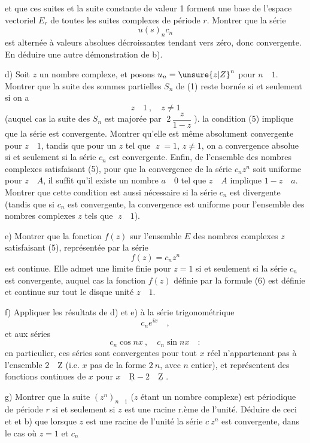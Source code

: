 et que ces suites et la suite constante de valeur 1 forment une base de l'espace vectoriel $E_r$ de toutes les suites complexes de période $r$. Montrer que la série
\[
u(s)_n c_n
\]
est alternée à valeurs absolues décroissantes tendant vers zéro, donc convergente. En déduire une autre démonstration de b).

d) Soit $z$ un nombre complexe, et posons $u_n=\unsure{z|Z}^{n}$ pour $n\quad 1$. Montrer que la suite des sommes partielles $S_n$ de (1) reste bornée si et seulement si on a
\[
z\quad1\ ,\quad z\ne1\tag*{(5)}
\]
(auquel cas la suite des $S_n$ est majorée par $\;2\,\dfrac{z}{1-z}\;$).   la condition (5) implique que la série   est convergente. Montrer qu'elle est même absolument convergente pour $z\quad1$, tandis que pour un $z$ tel que $\;z\;=1$, $z\ne1$, on a convergence absolue si et seulement si la  série $c_n$ est convergente. Enfin,   de l'ensemble  des nombres complexes satisfaisant (5), pour que la convergence de la série $c_n z^n$ soit uniforme pour $z\quad A$, il suffit qu'il existe un nombre $a\quad0$ tel que $z\quad A$ implique $1-z\quad a$. Montrer que cette condition est aussi nécessaire si la série $c_n$ est divergente (tandis que si $c_n$ est convergente, la convergence est uniforme pour l'ensemble des nombres complexes $z$ tels que $\;z\quad1$). 

e) Montrer que la fonction $f(z)$ sur l'ensemble $E$ des nombres complexes $z$ satisfaisant (5), représentée par la série
\[
f(z)=c_n z^n\tag*{(6)}
\]
est continue. Elle admet une limite finie pour $z=1$ si et seulement si la  série $c_n$ est convergente, auquel cas la fonction $f(z)$ définie par la formule (6) est définie et continue  sur tout le disque unité $z\quad1$.

f) Appliquer les résultats de d) et e) à la série trigonométrique
\[
c_n e^{ix}\quad ,
\]
et aux séries
\[
c_n\cos nx\ ,\quad c_n\sin nx\quad :
\]
en particulier, ces séries sont convergentes pour tout $x$ réel n'appartenant pas à l'ensemble  $2\quad\underline{\mathrm Z}$ (i.e. $x$ pas de la forme $2\ n$, avec $n$ entier), et représentent des fonctions continues de $x$ pour $x\quad\underline{\mathrm R}-2\quad\underline{\mathrm Z}$ .

g) Montrer que la suite $(z^n)_{n\quad1}$ ($z$ étant un nombre complexe) est périodique de période $r$ si et seulement si $z$ est une racine r.ème de l'unité.  Déduire de ceci et et b) que lorsque $z$ est une racine de l'unité la série  $c\ z^n$ est convergente,  dans le cas où $z=1$ et $c_n$ 
